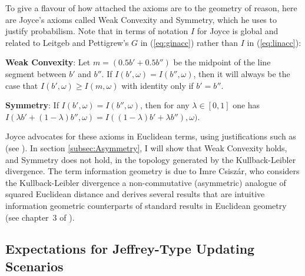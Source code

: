 \documentclass[phd,12pt,oneside]{ubcthesis}
\begin{document}
To give a flavour of how attached the axioms are to the geometry of
reason, here are Joyce's axioms called Weak Convexity and Symmetry,
which he uses to justify probabilism. Note that in terms of notation
$I$ for Joyce is global and related to Leitgeb and Pettigrew's $G$ in
(\ref{eq:ginacc}) rather than $I$ in (\ref{eq:linacc}):

\begin{quotex}
\label{quot:weakconv}
  \textbf{Weak Convexity}: Let $m=(0.5b'+0.5b'')$ be the midpoint of the line
  segment between $b'$ and $b''$. If $I(b',\omega)=I(b'',\omega)$,
  then it will always be the case that $I(b',\omega)\geq{}I(m,\omega)$
  with identity only if $b'=b''$.
\end{quotex}

\begin{quotex}
\label{quot:symmetry}
  \textbf{Symmetry}: If $I(b',\omega)=I(b'',\omega)$, then for any
  $\lambda\in{}[0,1]$ one has\newline
  $I(\lambda{}b'+(1-\lambda)b'',\omega)=I((1-\lambda){}b'+\lambda{}b''),\omega)$.
\end{quotex}

Joyce advocates for these axioms in Euclidean terms, using
justifications such as  (see ). In section
\ref{subsec:Asymmetry}, I will show that Weak Convexity holds, and
Symmetry does not hold, in  the topology
generated by the Kullback-Leibler divergence. The term information
geometry is due to Imre Csisz{\'a}r, who considers the
Kullback-Leibler divergence a non-commutative (asymmetric) analogue of
squared Euclidean distance and derives several results that are
intuitive information geometric counterparts of standard results in
Euclidean geometry (see chapter~3 of ).

\subsection{Expectations for Jeffrey-Type Updating Scenarios}
\label{subsec:vidiedoo}
\end{document}
